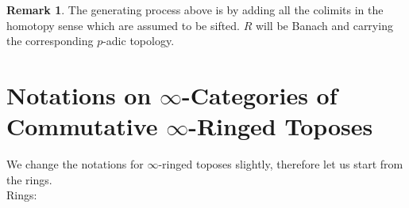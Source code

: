 \documentclass[11pt]{book}
\theoremstyle{definition}
\newtheorem{remark}[theorem]{Remark}
\numberwithin{equation}{section}
\begin{document}
\begin{remark}
The generating process above is by adding all the colimits in the homotopy sense which are assumed to be sifted. $R$ will be Banach and carrying the corresponding $p$-adic topology.
\end{remark}




\newpage
\section{Notations on $\infty$-Categories of Commutative $\infty$-Ringed Toposes}

\indent We change the notations for $\infty$-ringed toposes slightly, therefore let us start from the rings.\\

\noindent Rings:\\
\end{document}
